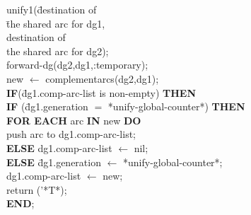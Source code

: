 \begin{footnotesize}
\begin{tabbing}
 \>                \> \hspace*{10mm} unify1(\= destination of \\
 \>                \>                       \> \hspace*{7mm} \= the
shared arc for dg1, \\
 \>                \>                       \> destination of \\
 \>                \>                       \>   \>  the shared arc
for dg2); \\
 \>                \> forward-dg(dg2,dg1,:temporary);\footnotemark \\
 \>                \>  new $\leftarrow$
complementarcs(dg2,dg1);\footnotemark   \\
 \>                \> {\bf IF}\footnotemark (\= dg1.comp-arc-list is
non-empty) {\bf THEN} \\
 \>                \>           \> {\bf IF} (\= dg1.generation $=$
*unify-global-counter*) {\bf THEN} \\
 \>                \>           \>          \> {\bf FOR EACH} arc {\bf
IN} new {\bf DO} \\
 \>                \>           \>          \> \hspace*{10mm} push arc
to dg1.comp-arc-list; \\
 \>                \>           \> {\bf ELSE} dg1.comp-arc-list
$\leftarrow$ nil;   \\
 \>                \> {\bf ELSE} \=  dg1.generation $\leftarrow$
*unify-global-counter*; \\
 \>                \>            \>  dg1.comp-arc-list $\leftarrow$
new; \\
 \>                \> return ('*T*); \\
 {\bf END}; 
\end{tabbing}


\end{footnotesize}

